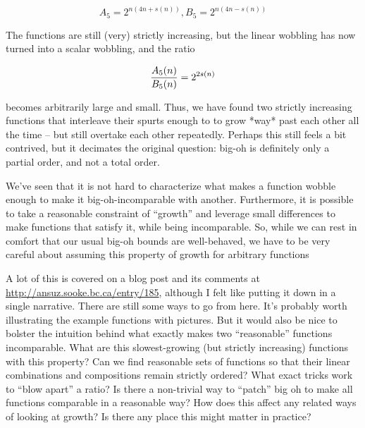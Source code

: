\documentclass[11pt]{amsart}
\begin{document}
$$A_5 = 2^{n \left(4n + s(n)\right)}, B_5 = 2^{n \left(4n - s(n)\right)}$$

The functions are still (very) strictly increasing, but the linear wobbling has now turned into a scalar wobbling, and the ratio

$${A_5(n) \over B_5(n)} = 2^{2 s(n)}$$

becomes arbitrarily large and small. Thus, we have found two strictly increasing functions that interleave their spurts enough to to grow *way* past each other all the time -- but still overtake each other repeatedly. Perhaps this still feels a bit contrived, but it decimates the original question: big-oh is definitely only a partial order, and not a total order.

We've seen that it is not hard to characterize what makes a function wobble enough to make it big-oh-incomparable with another. Furthermore, it is possible to take a reasonable constraint of ``growth'' and leverage small differences to make functions that satisfy it, while being incomparable. So, while we can rest in comfort that our usual big-oh bounds are well-behaved, we have to be very careful about assuming this property of growth for arbitrary functions

A lot of this is covered on a blog post and its comments at \url{http://ansuz.sooke.bc.ca/entry/185}, although I felt like putting it down in a single narrative. There are still some ways to go from here. It's probably worth illustrating the example functions with pictures. But it would also be nice to bolster the intuition behind what exactly makes two ``reasonable'' functions incomparable. What are this slowest-growing (but strictly increasing) functions with this property? Can we find reasonable sets of functions so that their linear combinations and compositions remain strictly ordered? What exact tricks work to ``blow apart'' a ratio? Is there a non-trivial way to ``patch'' big oh to make all functions comparable in a reasonable way? How does this affect any related ways of looking at growth? Is there any place this might matter in practice?
\end{document}
